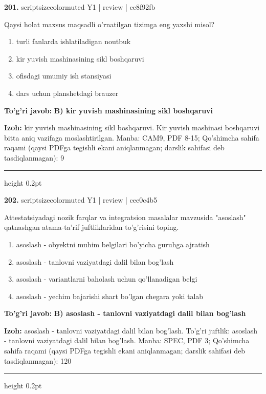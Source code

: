 \documentclass[10pt,a4paper]{article}
\begin{document}
{\bfseries\sffamily\color{ink} 201.} {scriptsizecolor{muted} Y1 | review | ce8f92fb}
\par
Qaysi holat maxsus maqsadli o'rnatilgan tizimga eng yaxshi misol?
\begin{enumerate}[label=\Alph*),leftmargin=9mm]
\item turli fanlarda ishlatiladigan noutbuk
\item kir yuvish mashinasining sikl boshqaruvi
\item ofisdagi umumiy ish stansiyasi
\item dars uchun planshetdagi brauzer
\end{enumerate}
\begin{tcolorbox}[enhanced,breakable,colback=teal!4,colframe=teal!60!black,boxrule=0.45pt,arc=1.2mm,left=2.7mm,right=2.7mm,top=1.8mm,bottom=1.8mm,before skip=2mm,after skip=2mm]
{\bfseries\sffamily\color{teal}To'g'ri javob:} \textbf{B) kir yuvish mashinasining sikl boshqaruvi}
\par\smallskip
{\bfseries Izoh:} kir yuvish mashinasining sikl boshqaruvi. Kir yuvish mashinasi boshqaruvi bitta aniq vazifaga moslashtirilgan. Manba: CAM9, PDF 8-15; Qo'shimcha sahifa raqami (qaysi PDFga tegishli ekani aniqlanmagan; darslik sahifasi deb tasdiqlanmagan): 9
\end{tcolorbox}
\vspace{2mm}\hrule height 0.2pt\vspace{3mm}

{\bfseries\sffamily\color{ink} 202.} {scriptsizecolor{muted} Y1 | review | cee0c4b5}
\par
Attestatsiyadagi nozik farqlar va integratsion masalalar mavzusida "asoslash" qatnashgan atama-ta'rif juftliklaridan to'g'risini toping.
\begin{enumerate}[label=\Alph*),leftmargin=9mm]
\item asoslash - obyektni muhim belgilari bo'yicha guruhga ajratish
\item asoslash - tanlovni vaziyatdagi dalil bilan bog'lash
\item asoslash - variantlarni baholash uchun qo'llanadigan belgi
\item asoslash - yechim bajarishi shart bo'lgan chegara yoki talab
\end{enumerate}
\begin{tcolorbox}[enhanced,breakable,colback=teal!4,colframe=teal!60!black,boxrule=0.45pt,arc=1.2mm,left=2.7mm,right=2.7mm,top=1.8mm,bottom=1.8mm,before skip=2mm,after skip=2mm]
{\bfseries\sffamily\color{teal}To'g'ri javob:} \textbf{B) asoslash - tanlovni vaziyatdagi dalil bilan bog'lash}
\par\smallskip
{\bfseries Izoh:} asoslash - tanlovni vaziyatdagi dalil bilan bog'lash. To'g'ri juftlik: asoslash - tanlovni vaziyatdagi dalil bilan bog'lash. Manba: SPEC, PDF 3; Qo'shimcha sahifa raqami (qaysi PDFga tegishli ekani aniqlanmagan; darslik sahifasi deb tasdiqlanmagan): 120
\end{tcolorbox}
\vspace{2mm}\hrule height 0.2pt\vspace{3mm}
\end{document}
